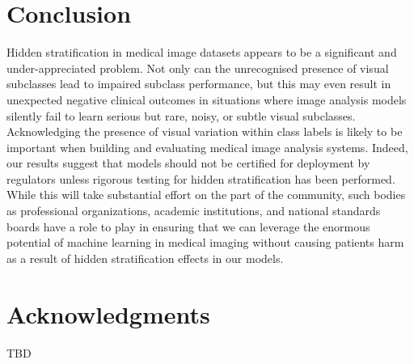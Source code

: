 \documentclass{article}
\begin{document}
\section{Conclusion}

Hidden stratification in medical image datasets appears to be a significant and under-appreciated problem. 
Not only can the unrecognised presence of visual subclasses lead to impaired subclass performance, but this may even result in unexpected negative clinical outcomes in situations where image analysis models silently fail to learn serious but rare, noisy, or subtle visual subclasses.
Acknowledging the presence of visual variation within class labels is likely to be important when building and evaluating medical image analysis systems.
Indeed, our results suggest that models should not be certified for deployment by regulators unless rigorous testing for hidden stratification has been performed.
While this will take substantial effort on the part of the community, such bodies as professional organizations, academic institutions, and national standards boards have a role to play in ensuring that we can leverage the enormous potential of machine learning in medical imaging without causing patients harm as a result of hidden stratification effects in our models.

\section*{Acknowledgments}
TBD



\end{document}
